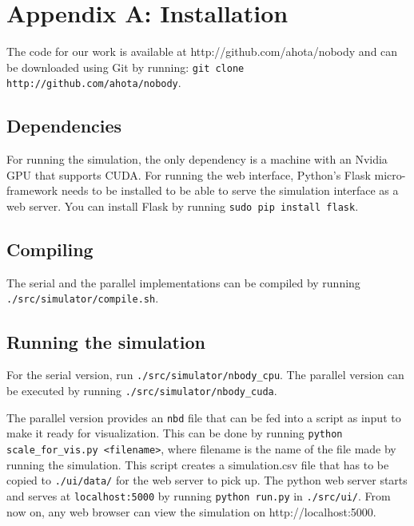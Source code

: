 \documentclass[10pt,a4paper]{article}
\begin{document}
	\section{Appendix A: Installation}
		The code for our work is available at http://github.com/ahota/nobody and can be downloaded using Git by running: \texttt{git clone http://github.com/ahota/nobody}.
		
		\subsection{Dependencies}
		For running the simulation, the only dependency is a machine with an Nvidia GPU that supports CUDA. For running the web interface, Python's Flask micro-framework needs to be installed to be able to serve the simulation interface as a web server. You can install Flask by running \texttt{sudo pip install flask}. 
		
		\subsection{Compiling}
		The serial and the parallel implementations can be compiled by running \texttt{./src/simulator/compile.sh}. 
		
		\subsection{Running the simulation}
		For the serial version, run \texttt{./src/simulator/nbody\_cpu}.
		The parallel version can be executed by running \texttt{./src/simulator/nbody\_cuda}.
		
		The parallel version provides an \texttt{nbd} file that can be fed into a script as input to make it ready for visualization. This can be done by running \texttt{python scale\_for\_vis.py <filename>}, where filename is the name of the file made by running the simulation. This script creates a simulation.csv file that has to be copied to \texttt{./ui/data/} for the web server to pick up. The python web server starts and serves at \texttt{localhost:5000} by running \texttt{python run.py} in \texttt{./src/ui/}. From now on, any web browser can view the simulation on http://localhost:5000.
		
\end{document}
